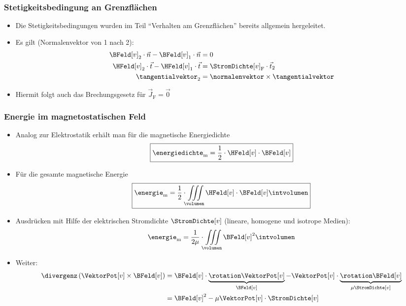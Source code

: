 \begin{frame}
  \frametitle{Stetigkeitsbedingung an Grenzflächen}
  \begin{itemize}[<+->]
  \item Die Stetigkeitsbedingungen wurden im Teil \enquote{Verhalten am Grenzflächen} bereits allgemein hergeleitet.
  \item Es gilt (Normalenvektor von 1 nach 2):
    \begin{align*}
	\BFeld[v]_2\cdot \vec{n} - \BFeld[v]_1\cdot\vec{n} &= 0 \\
	\HFeld[v]_2\cdot \vec{t} - \HFeld[v]_1\cdot \vec{t} & = \StromDichte[v]_\mathrm{F}\cdot \vec{t}_2\\
	\tangentialvektor_2 & = \normalenvektor \times \tangentialvektor
\end{align*}
\item Hiermit folgt auch das \alert{Brechungsgesetz für $\vec{J}_{\text{F}} = \vec{0}$}

  \resizebox{.35\linewidth}{!}{} 
  
  \end{itemize}
\end{frame}

\begin{frame}
  \frametitle{Energie im magnetostatischen Feld}
  \begin{itemize}[<+->]
    \item Analog zur Elektrostatik erhält man für die \alert{magnetische Energiedichte}
\begin{equation*}
	\boxed{\energiedichte_\mathrm{m} = \dfrac{1}{2} \cdot \HFeld[v] \cdot \BFeld[v]}
\end{equation*}
\item Für die gesamte \alert{magnetische Energie}
\begin{equation*}
	\boxed{\energie_\mathrm{m} = \dfrac{1}{2} \cdot \iiint\limits_{\volumen} \HFeld[v] \cdot \BFeld[v] \intvolumen} 
\end{equation*}
\item Ausdrücken mit Hilfe der elektrischen Stromdichte \(\StromDichte[v] \) (lineare, homogene und isotrope Medien): 
\begin{equation*}
	\energie_\mathrm{m} = \dfrac{1}{2 \mu} \cdot \iiint\limits_{\volumen} \BFeld[v]^2 \intvolumen
\end{equation*}
\item Weiter:
\begin{align*}
	\divergenz \left( \VektorPot[v] \times \BFeld[v] \right) &= \BFeld[v] \cdot \underbrace{\rotation \VektorPot[v]}_{\BFeld[v]} - \VektorPot[v] \cdot \underbrace{\rotation \BFeld[v]}_{\mu \StromDichte[v]} \\
		&= \BFeld[v]^2 - \mu  \VektorPot[v] \cdot \StromDichte[v]
\end{align*}
  \end{itemize}
\end{frame}

